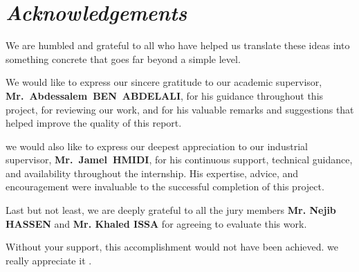 \clearpage
\chapter*{{\emph{\huge{Acknowledgements}}}}

\vspace{-1cm}


We are humbled and grateful to all who have helped us translate these ideas into something concrete that goes far beyond a simple level.

We would like to express our sincere gratitude to our academic supervisor, \textbf{Mr.~Abdessalem~BEN~ABDELALI}, for his guidance throughout this project, for reviewing our work, and for his valuable remarks and suggestions that helped improve the quality of this report.

we would also like to express our deepest appreciation to our industrial supervisor, \textbf{Mr.~Jamel~HMIDI}, for his continuous support, technical guidance, and availability throughout the internship. His expertise, advice, and encouragement were invaluable to the successful completion of this project.

Last but not least, we are deeply grateful to all the jury members \textbf{Mr. Nejib HASSEN} and \textbf{Mr. Khaled ISSA} for agreeing to evaluate this work.

Without your support, this accomplishment would not have been achieved. we really appreciate it .


